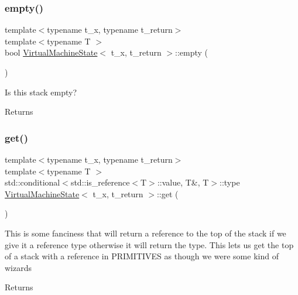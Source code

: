 \subsubsection{\texorpdfstring{empty()}{empty()}}
{\footnotesize\ttfamily template$<$typename t\+\_\+x, typename t\+\_\+return$>$ \\
template$<$typename T $>$ \\
bool \hyperlink{class_virtual_machine_state}{Virtual\+Machine\+State}$<$ t\+\_\+x, t\+\_\+return $>$\+::empty (\begin{DoxyParamCaption}{ }\end{DoxyParamCaption})\hspace{0.3cm}{\ttfamily [inline]}}

Is this stack empty? \begin{DoxyReturn}{Returns}

\end{DoxyReturn}
\mbox{\label{class_virtual_machine_state_ad29d1a4f0a8943dccf98cdcbe16089fe}} 
\subsubsection{\texorpdfstring{get()}{get()}}
{\footnotesize\ttfamily template$<$typename t\+\_\+x, typename t\+\_\+return$>$ \\
template$<$typename T $>$ \\
std\+::conditional$<$std\+::is\+\_\+reference$<$T$>$\+::value, T\&, T$>$\+::type \hyperlink{class_virtual_machine_state}{Virtual\+Machine\+State}$<$ t\+\_\+x, t\+\_\+return $>$\+::get (\begin{DoxyParamCaption}{ }\end{DoxyParamCaption})\hspace{0.3cm}{\ttfamily [inline]}}

This is some fanciness that will return a reference to the top of the stack if we give it a reference type otherwise it will return the type. This lets us get the top of a stack with a reference in P\+R\+I\+M\+I\+T\+I\+V\+ES as though we were some kind of wizards \begin{DoxyReturn}{Returns}

\end{DoxyReturn}
\mbox{\label{class_virtual_machine_state_a0d5aba3d124a9e987113a1440fec64b5}} 
